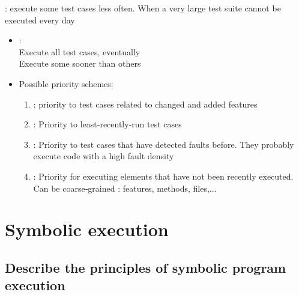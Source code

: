  : execute some test cases less often. When a very large test suite cannot be executed every day
\begin{itemize}
    \item {} :\\
    Execute all test cases, eventually \\
    Execute some sooner than others
    \item Possible priority schemes:
    \begin{enumerate}
        \item {} : priority to test cases related to changed and added features
        \item {} : Priority to least‐recently‐run test cases
        \item {} : Priority to test cases that have detected faults before. They probably execute code with a high fault density
        \item {} : Priority for executing elements that have not been recently executed. Can be coarse‐grained : features, methods, files,...
    \end{enumerate}
\end{itemize}

\chapter{Symbolic execution}

\section{Describe the principles of symbolic program execution}


